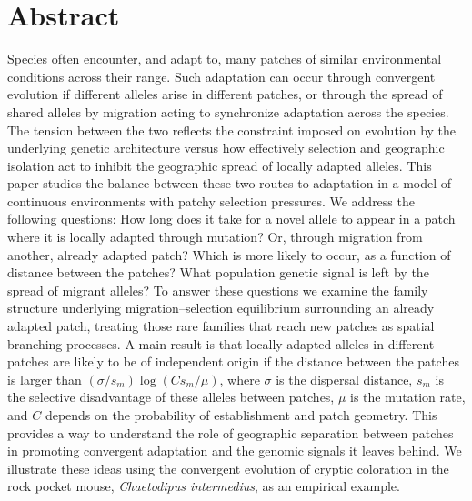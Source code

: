 \documentclass[10pt,letterpaper]{article}
\begin{document}
\section*{Abstract}
Species often encounter, and adapt to, 
many patches of similar environmental conditions across their range. 
Such adaptation can occur through convergent evolution 
if different alleles arise in different patches, 
or through the spread of shared alleles by migration
acting to synchronize adaptation across the species.
The tension between the two reflects 
the constraint imposed on evolution by the underlying genetic architecture 
versus how effectively selection and geographic isolation 
act to inhibit the geographic spread of locally adapted alleles.
This paper studies the balance between these two routes to adaptation 
in a model of continuous environments with patchy selection pressures.
We address the following questions: 
How long does it take for a novel allele to appear in a
patch where it is locally adapted through mutation?
Or, through migration from another, already adapted patch?
Which is more likely to occur, as a function of distance between the patches?
What population genetic signal is left by the spread of migrant alleles?
To answer these questions we examine the family structure 
underlying migration--selection equilibrium
surrounding an already adapted patch,
treating those rare families that reach new patches
as spatial branching processes.
A main result is that locally adapted alleles in different patches
are likely to be of independent origin
if the distance between the patches is larger than
$(\sigma/s_m)\log(Cs_m/\mu)$, 
where $\sigma$ is the dispersal distance, 
$s_m$ is the selective disadvantage of these alleles between patches,
$\mu$ is the mutation rate, 
and $C$ depends on the probability of establishment and patch geometry.
This provides a way to understand the role of geographic separation between patches 
in promoting convergent adaptation and the genomic signals it leaves behind.
We illustrate these ideas using the convergent evolution of cryptic coloration in the rock pocket mouse, \textit{Chaetodipus intermedius}, as an empirical example.


\end{document}
